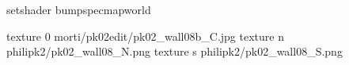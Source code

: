 setshader bumpspecmapworld

texture 0 morti/pk02edit/pk02_wall08b_C.jpg
texture n philipk2/pk02_wall08_N.png
texture s philipk2/pk02_wall08_S.png

